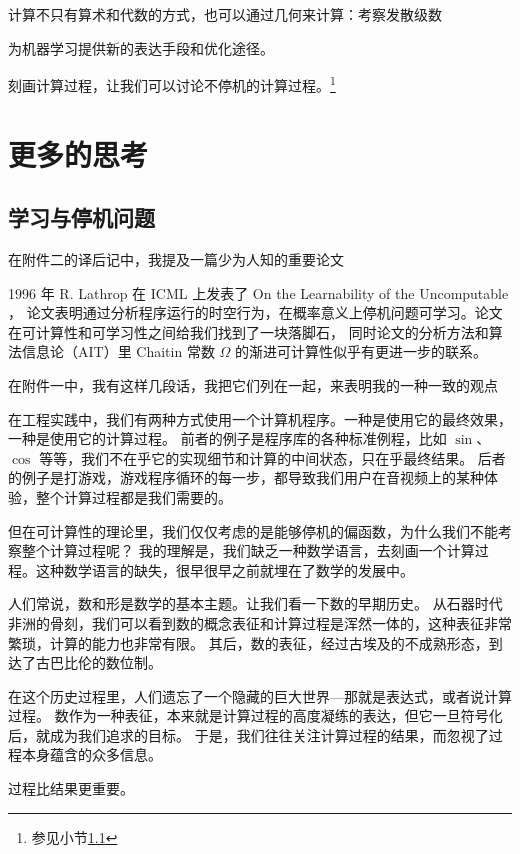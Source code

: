 \documentclass[a4paper,12pt]{article}
\numberwithin{problem}{section}
\numberwithin{definition}{section}
\numberwithin{lemma}{section}
\numberwithin{proposition}{section}
\numberwithin{theorem}{section}
\numberwithin{grammar}{section}
\numberwithin{program}{section}
\numberwithin{convention}{section}
\numberwithin{corollary}{section}
\begin{document}
计算不只有算术和代数的方式，也可以通过几何来计算：考察发散级数

为机器学习提供新的表达手段和优化途径。

刻画计算过程，让我们可以讨论不停机的计算过程。\footnote{参见小节\ref{sec:learnandhalt}}

\newpage

\section{更多的思考}

\subsection{学习与停机问题}\label{sec:learnandhalt}

在附件二的译后记中，我提及一篇少为人知的重要论文

\begin{displayquote}
1996 年 R. Lathrop 在 ICML 上发表了 On the Learnability of the Uncomputable ，
论文表明通过分析程序运行的时空行为，在概率意义上停机问题可学习。论文在可计算性和可学习性之间给我们找到了一块落脚石，
同时论文的分析方法和算法信息论（AIT）里 Chaitin 常数 $\Omega$ 的渐进可计算性似乎有更进一步的联系。
\end{displayquote}

在附件一中，我有这样几段话，我把它们列在一起，来表明我的一种一致的观点

\begin{displayquote}
在工程实践中，我们有两种方式使用一个计算机程序。一种是使用它的最终效果，一种是使用它的计算过程。
前者的例子是程序库的各种标准例程，比如 $\sin$、$\cos$ 等等，我们不在乎它的实现细节和计算的中间状态，只在乎最终结果。
后者的例子是打游戏，游戏程序循环的每一步，都导致我们用户在音视频上的某种体验，整个计算过程都是我们需要的。
\end{displayquote}

但在可计算性的理论里，我们仅仅考虑的是能够停机的偏函数，为什么我们不能考察整个计算过程呢？
我的理解是，我们缺乏一种数学语言，去刻画一个计算过程。这种数学语言的缺失，很早很早之前就埋在了数学的发展中。

\begin{displayquote}
人们常说，数和形是数学的基本主题。让我们看一下数的早期历史。
从石器时代非洲的骨刻，我们可以看到数的概念表征和计算过程是浑然一体的，这种表征非常繁琐，计算的能力也非常有限。
其后，数的表征，经过古埃及的不成熟形态，到达了古巴比伦的数位制。

在这个历史过程里，人们遗忘了一个隐藏的巨大世界—那就是表达式，或者说计算过程。
数作为一种表征，本来就是计算过程的高度凝练的表达，但它一旦符号化后，就成为我们追求的目标。
于是，我们往往关注计算过程的结果，而忽视了过程本身蕴含的众多信息。

过程比结果更重要。
\end{displayquote}
\end{document}
